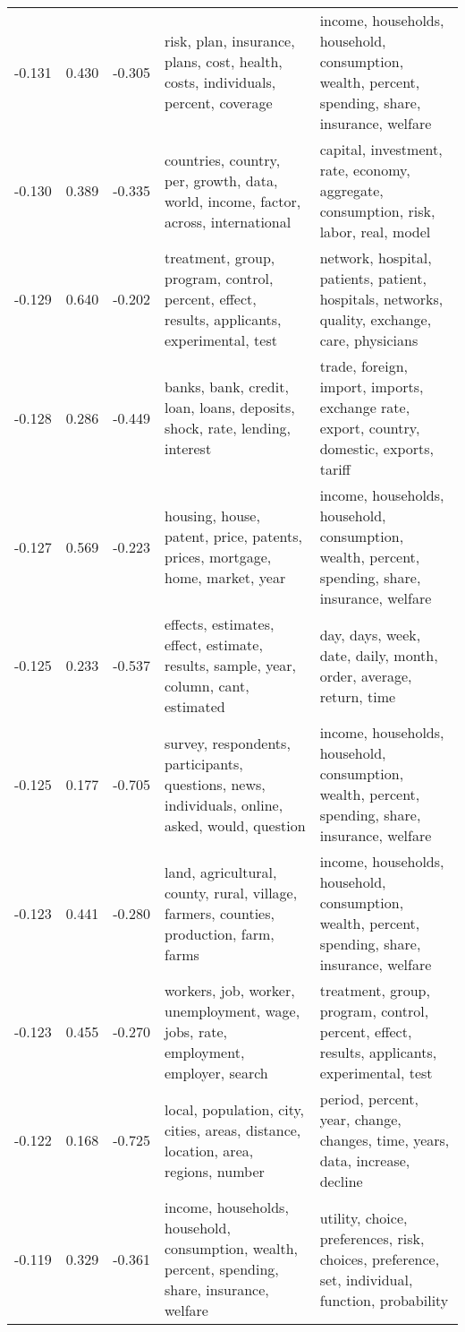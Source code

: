 \begin{tabular}{cccp{5cm}p{5cm}}
-0.131 & 0.430 & -0.305 & risk, plan, insurance, plans, cost, health, costs, individuals, percent, coverage & income, households, household, consumption, wealth, percent, spending, share, insurance, welfare \\
-0.130 & 0.389 & -0.335 & countries, country, per, growth, data, world, income, factor, across, international & capital, investment, rate, economy, aggregate, consumption, risk, labor, real, model \\
-0.129 & 0.640 & -0.202 & treatment, group, program, control, percent, effect, results, applicants, experimental, test & network, hospital, patients, patient, hospitals, networks, quality, exchange, care, physicians \\
-0.128 & 0.286 & -0.449 & banks, bank, credit, loan, loans, deposits, shock, rate, lending, interest & trade, foreign, import, imports, exchange rate, export, country, domestic, exports, tariff \\
-0.127 & 0.569 & -0.223 & housing, house, patent, price, patents, prices, mortgage, home, market, year & income, households, household, consumption, wealth, percent, spending, share, insurance, welfare \\
-0.125 & 0.233 & -0.537 & effects, estimates, effect, estimate, results, sample, year, column, cant, estimated & day, days, week, date, daily, month, order, average, return, time \\
-0.125 & 0.177 & -0.705 & survey, respondents, participants, questions, news, individuals, online, asked, would, question & income, households, household, consumption, wealth, percent, spending, share, insurance, welfare \\
-0.123 & 0.441 & -0.280 & land, agricultural, county, rural, village, farmers, counties, production, farm, farms & income, households, household, consumption, wealth, percent, spending, share, insurance, welfare \\
-0.123 & 0.455 & -0.270 & workers, job, worker, unemployment, wage, jobs, rate, employment, employer, search & treatment, group, program, control, percent, effect, results, applicants, experimental, test \\
-0.122 & 0.168 & -0.725 & local, population, city, cities, areas, distance, location, area, regions, number & period, percent, year, change, changes, time, years, data, increase, decline \\
-0.119 & 0.329 & -0.361 & income, households, household, consumption, wealth, percent, spending, share, insurance, welfare & utility, choice, preferences, risk, choices, preference, set, individual, function, probability \\
\bottomrule
\end{tabular}
